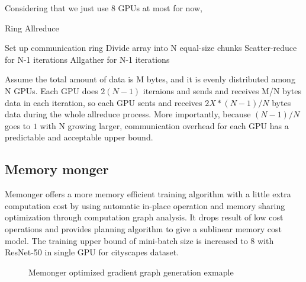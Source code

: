 Considering that we just use 8 GPUs at most for now, 

\begin{algorithm}
    \caption{Ring Allreduce}
    \label{alg:ring-allreduce}
    \begin{algorithmic}[1]
        \State Set up communication ring
        \State Divide array into N equal-size chunks
        \State Scatter-reduce for N-1 iterations
        \State Allgather for N-1 iterations
    \end{algorithmic}
\end{algorithm}

Assume the total amount of data is M bytes, and it is evenly distributed among N GPUs. Each GPU does $2(N-1)$ iteraions and sends and receives M/N bytes data in each iteration, so each GPU sents and receives $2X*(N-1)/N$ bytes data during the whole allreduce process. More importantly, because $(N-1)/N$ goes to $1$ with N growing larger, communication overhead for each GPU has a predictable and acceptable upper bound.

\subsection{Memory monger}


Memonger\cite{tianqichen-memonger} offers a more memory efficient training algorithm with a little extra computation cost by using automatic in-place operation and memory sharing optimization through computation graph analysis. It drops result of low cost operations and provides planning algorithm to give a sublinear memory cost model. The training upper bound of mini-batch size is increased to 8 with ResNet-50 in single GPU for cityscapes dataset.

\begin{figure}[h]
    \begin{center}
    \caption{Memonger optimized gradient graph generation exmaple }%
    \label{fig:Memonger}
    \end{center}
    \end{figure}

